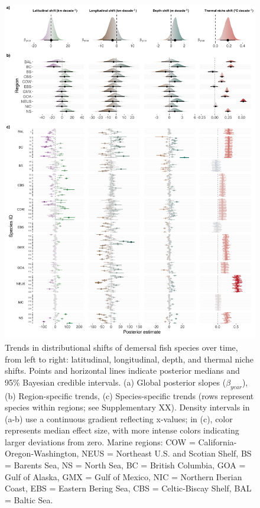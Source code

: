 \documentclass[11pt]{article}
\begin{document}
\begin{spacing}{1.5}
\begin{figure}[h]
    \centering
    \includegraphics[scale=0.58]{output/figures/slopes.png}
\caption{Trends in distributional shifts of demersal fish species over time, from left to right: latitudinal, longitudinal, depth, and thermal niche shifts. Points and horizontal lines indicate posterior medians and 95\% Bayesian credible intervals.  
(a) Global posterior slopes ($\beta_{year}$),  
(b) Region-specific trends,  
(c) Species-specific trends (rows represent species within regions; see Supplementary XX).  
Density intervals in (a-b) use a continuous gradient reflecting x-values; in (c), color represents median effect size, with more intense colors indicating larger deviations from zero.  
Marine regions: COW = California-Oregon-Washington, NEUS = Northeast U.S. and Scotian Shelf, BS = Barents Sea, NS = North Sea, BC = British Columbia, GOA = Gulf of Alaska, GMX = Gulf of Mexico, NIC = Northern Iberian Coast, EBS = Eastern Bering Sea, CBS = Celtic-Biscay Shelf, BAL = Baltic Sea.}
    \label{fig:effsize}
\end{figure}



\end{spacing}
\end{document}
